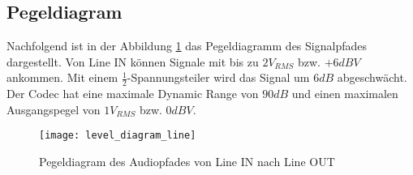 \subsection{Pegeldiagram}
\label{sec:Pegeldiagram}

Nachfolgend ist in der Abbildung \ref{pic:Pegeldiagram_Line} das Pegeldiagramm des Signalpfades dargestellt.
Von Line IN können Signale mit bis zu $2 \si{V_{RMS}}$ bzw. $+6 \si{dBV}$ ankommen. Mit einem $\frac{1}{2}$-Spannungsteiler wird das Signal um $6 \si{dB}$ abgeschwächt.
Der Codec hat eine maximale Dynamic Range von $90 \si{dB}$ und einen maximalen Ausgangspegel von $1 \si{V_{RMS}}$ bzw. $0 \si{dBV}$.

\begin{figure}[H]
	\centering
	\texttt{[image: level\_diagram\_line]}
	\caption{Pegeldiagram des Audiopfades von Line IN nach Line OUT}
	\label{pic:Pegeldiagram_Line}
\end{figure}

